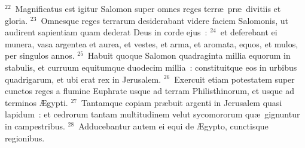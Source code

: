 ${}^{22}$~Magnificatus est igitur Salomon super omnes reges terr\ae\ pr\ae\ divitiis et gloria.
${}^{23}$~Omnesque reges terrarum desiderabant videre faciem Salomonis, ut audirent sapientiam quam dederat Deus in corde ejus~:
${}^{24}$~et deferebant ei munera, vasa argentea et aurea, et vestes, et arma, et aromata, equos, et mulos, per singulos annos.
${}^{25}$~Habuit quoque Salomon quadraginta millia equorum in stabulis, et curruum equitumque duodecim millia~: constituitque eos in urbibus quadrigarum, et ubi erat rex in Jerusalem.
${}^{26}$~Exercuit etiam potestatem super cunctos reges a flumine Euphrate usque ad terram Philisthinorum, et usque ad terminos \AE gypti.
${}^{27}$~Tantamque copiam pr\ae buit argenti in Jerusalem quasi lapidum~: et cedrorum tantam multitudinem velut sycomororum qu\ae\ gignuntur in campestribus.
${}^{28}$~Adducebantur autem ei equi de \AE gypto, cunctisque regionibus.


